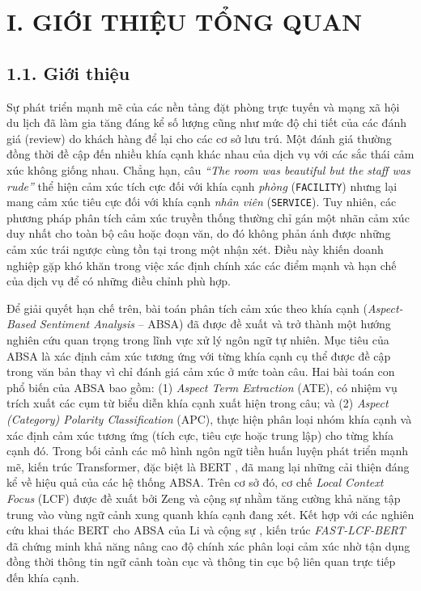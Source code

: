 \chapter{I. GIỚI THIỆU TỔNG QUAN}
\section{1.1. Giới thiệu}

Sự phát triển mạnh mẽ của các nền tảng đặt phòng trực tuyến và mạng xã hội du lịch đã làm gia tăng đáng kể số lượng cũng như mức độ chi tiết của các đánh giá (review) do khách hàng để lại cho các cơ sở lưu trú. Một đánh giá thường đồng thời đề cập đến nhiều khía cạnh khác nhau của dịch vụ với các sắc thái cảm xúc không giống nhau. Chẳng hạn, câu \textit{``The room was beautiful but the staff was rude''} thể hiện cảm xúc tích cực đối với khía cạnh \textit{phòng} (\texttt{FACILITY}) nhưng lại mang cảm xúc tiêu cực đối với khía cạnh \textit{nhân viên} (\texttt{SERVICE}). Tuy nhiên, các phương pháp phân tích cảm xúc truyền thống thường chỉ gán một nhãn cảm xúc duy nhất cho toàn bộ câu hoặc đoạn văn, do đó không phản ánh được những cảm xúc trái ngược cùng tồn tại trong một nhận xét. Điều này khiến doanh nghiệp gặp khó khăn trong việc xác định chính xác các điểm mạnh và hạn chế của dịch vụ để có những điều chỉnh phù hợp.

Để giải quyết hạn chế trên, bài toán phân tích cảm xúc theo khía cạnh (\textit{Aspect-Based Sentiment Analysis} -- ABSA) đã được đề xuất và trở thành một hướng nghiên cứu quan trọng trong lĩnh vực xử lý ngôn ngữ tự nhiên. Mục tiêu của ABSA là xác định cảm xúc tương ứng với từng khía cạnh cụ thể được đề cập trong văn bản thay vì chỉ đánh giá cảm xúc ở mức toàn câu. Hai bài toán con phổ biến của ABSA bao gồm: (1) \textit{Aspect Term Extraction} (ATE), có nhiệm vụ trích xuất các cụm từ biểu diễn khía cạnh xuất hiện trong câu; và (2) \textit{Aspect (Category) Polarity Classification} (APC), thực hiện phân loại nhóm khía cạnh và xác định cảm xúc tương ứng (tích cực, tiêu cực hoặc trung lập) cho từng khía cạnh đó. Trong bối cảnh các mô hình ngôn ngữ tiền huấn luyện phát triển mạnh mẽ, kiến trúc Transformer, đặc biệt là BERT \cite{devlin2019bert}, đã mang lại những cải thiện đáng kể về hiệu quả của các hệ thống ABSA. Trên cơ sở đó, cơ chế \textit{Local Context Focus} (LCF) được đề xuất bởi Zeng và cộng sự \cite{zeng2019lcf} nhằm tăng cường khả năng tập trung vào vùng ngữ cảnh xung quanh khía cạnh đang xét. Kết hợp với các nghiên cứu khai thác BERT cho ABSA của Li và cộng sự \cite{li2019exploiting}, kiến trúc \textit{FAST-LCF-BERT} đã chứng minh khả năng nâng cao độ chính xác phân loại cảm xúc nhờ tận dụng đồng thời thông tin ngữ cảnh toàn cục và thông tin cục bộ liên quan trực tiếp đến khía cạnh.

